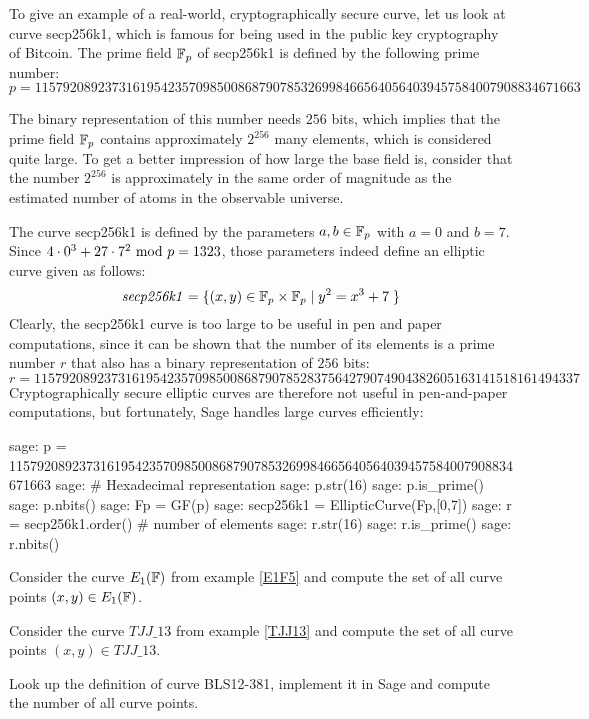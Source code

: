 \begin{example}\label{secp256k1}
To give an example of a real-world, cryptographically secure curve, let us look at curve secp256k1, which is famous for being used in the public key cryptography of Bitcoin. The prime field $\mathbb{F}_p$ of secp256k1 is defined by the following prime number:
$$
p = \scriptstyle 115792089237316195423570985008687907853269984665640564039457584007908834671663
$$
 
 The binary representation of this number needs $256$ bits, which implies that the prime field $\mathbb{F}_p$  contains approximately $2^{256}$ many elements, which is considered quite large. To get a better impression of how large the base field is, consider that the number $2^{256}$ is approximately in the same order of magnitude as the estimated number of atoms in the observable universe. 

The curve secp256k1 is defined by the parameters $a,b\in \mathbb{F}_p$ with $a=0$ and $b=7$. Since $4\cdot 0^3 + 27\cdot 7^2 \text{ mod } p=1323$, those parameters indeed define an elliptic curve given as follows:
$$
\mathit{secp256k1} = \{(x,y)\in \mathbb{F}_p\times \mathbb{F}_p \;|\; y^2 = x^3 +7\;\} 
$$
Clearly, the secp256k1 curve is too large to be useful in pen and paper computations, since it can be shown that  the number of its elements is a prime number $r$ that also has a binary representation of $256$ bits:
$$
r = \scriptstyle 11579208923731619542357098500868790785283756427907490438260516
3141518161494337
$$
Cryptographically secure elliptic curves are therefore not useful in pen-and-paper computations, but fortunately, Sage handles large curves efficiently:
\begin{sagecommandline}
sage: p = 115792089237316195423570985008687907853269984665640564039457584007908834671663
sage: # Hexadecimal representation
sage: p.str(16)
sage: p.is_prime()
sage: p.nbits()
sage: Fp = GF(p)
sage: secp256k1 = EllipticCurve(Fp,[0,7])
sage: r = secp256k1.order() # number of elements
sage: r.str(16)
sage: r.is_prime()
sage: r.nbits()
\end{sagecommandline}
\end{example}
\begin{exercise} Consider the curve $E_1(\mathbb{F})$ from example \ref{E1F5} and compute the set of all curve points $(x,y)\in E_1(\mathbb{F})$.
\end{exercise}
\begin{exercise} Consider the curve $TJJ\_13$ from example \ref{TJJ13} and compute the set of all curve points $(x,y)\in TJJ\_13$.
\end{exercise}
\begin{exercise}
Look up the definition of curve BLS12-381, implement it in Sage and compute the number of all curve points.
\end{exercise}

